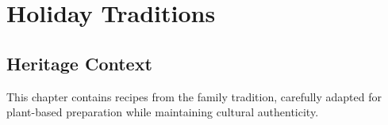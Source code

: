 \chapter{Holiday Traditions}

\section*{Heritage Context}

This chapter contains recipes from the family tradition, carefully adapted for plant-based preparation while maintaining cultural authenticity.

% 

